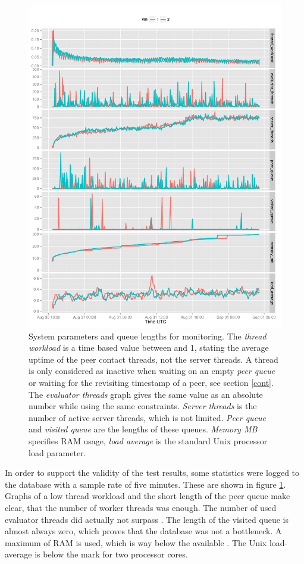\documentclass[10pt, a4paper, twoside, headsepline]{scrbook}
\renewcommand{\_}{\origunderscore\allowbreak}
\begin{document}
\begin{figure}
\centering
\includegraphics[width=\textwidth]{../result/2015-08-30_20-combined_workload}
\caption[Monitoring parameters during the analysis]{System parameters and queue lengths for monitoring. The \emph{thread workload} is a time based value between  and {1}, stating the average uptime of the peer contact threads, not the server threads. A thread is only considered as inactive when waiting on an empty \emph{peer queue} or waiting for the revisiting timestamp of a peer, see section \ref{cont}. The \emph{evaluator threads} graph gives the same value as an absolute number while using the same constraints. \emph{Server threads} is the number of active server threads, which is not limited. \emph{Peer queue} and \emph{visited queue} are the lengths of these queues. \emph{Memory MB} specifies RAM usage, \emph{load average} is the standard Unix processor load parameter.}
\label{workload}
\end{figure}

In order to support the validity of the test results, some statistics were logged to the database with a sample rate of five minutes. These are shown in figure \ref{workload}. Graphs of a low thread workload and the short length of the peer queue make clear, that the number of  worker threads was enough. The number of used evaluator threads did actually not surpass . The length of the visited queue is almost always zero, which proves that the database was not a bottleneck. A maximum of  RAM is used, which is way below the available . The Unix load-average is below the  mark for two processor cores.
\end{document}
